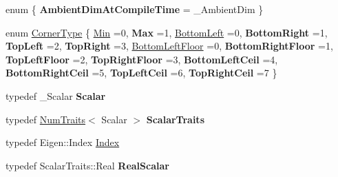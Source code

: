 \begin{DoxyCompactItemize}
\item 
\mbox{\label{class_eigen_1_1_aligned_box_a5662be619deba3ff232f9c6a521aed4c}} 
enum \{ {\bfseries Ambient\+Dim\+At\+Compile\+Time} = \+\_\+\+Ambient\+Dim
 \}
\item 
enum \mbox{\hyperlink{class_eigen_1_1_aligned_box_ae4aa935b36004fffc49c7a3a85e2d378}{Corner\+Type}} \{ \newline
\mbox{\hyperlink{class_eigen_1_1_aligned_box_ae4aa935b36004fffc49c7a3a85e2d378a600b5a58e77104ef7281dba6dcffb808}{Min}} =0, 
{\bfseries Max} =1, 
\mbox{\hyperlink{class_eigen_1_1_aligned_box_ae4aa935b36004fffc49c7a3a85e2d378a384d9fbe2c6b6b69a8ea7c5632a61f5c}{Bottom\+Left}} =0, 
{\bfseries Bottom\+Right} =1, 
\newline
{\bfseries Top\+Left} =2, 
{\bfseries Top\+Right} =3, 
\mbox{\hyperlink{class_eigen_1_1_aligned_box_ae4aa935b36004fffc49c7a3a85e2d378a66786d5e4ba263c9725c3476fc421281}{Bottom\+Left\+Floor}} =0, 
{\bfseries Bottom\+Right\+Floor} =1, 
\newline
{\bfseries Top\+Left\+Floor} =2, 
{\bfseries Top\+Right\+Floor} =3, 
{\bfseries Bottom\+Left\+Ceil} =4, 
{\bfseries Bottom\+Right\+Ceil} =5, 
\newline
{\bfseries Top\+Left\+Ceil} =6, 
{\bfseries Top\+Right\+Ceil} =7
 \}
\item 
\mbox{\label{class_eigen_1_1_aligned_box_a37cedc71a1b9fd2a4fd64b9039766e4e}} 
typedef \+\_\+\+Scalar {\bfseries Scalar}
\item 
\mbox{\label{class_eigen_1_1_aligned_box_a6c4cc47999fea11dc1a3dfb6830238b0}} 
typedef \mbox{\hyperlink{struct_eigen_1_1_num_traits}{Num\+Traits}}$<$ Scalar $>$ {\bfseries Scalar\+Traits}
\item 
typedef Eigen\+::\+Index \mbox{\hyperlink{class_eigen_1_1_aligned_box_a774ef355da13d6bee6a6e7244c15231a}{Index}}
\item 
\mbox{\label{class_eigen_1_1_aligned_box_add3256591bc5c7aeeec7dd1f778150a3}} 
typedef Scalar\+Traits\+::\+Real {\bfseries Real\+Scalar}
\item 
\mbox{\label{class_eigen_1_1_aligned_box_a45b593f77fd7fd0b21bb0fad8ff49d74}} 

\end{DoxyCompactItemize}
